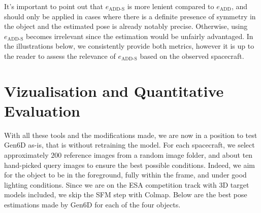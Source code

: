 It's important to point out that $e_{\mathrm{ADD}\text{-}\mathrm{S}}$ is more lenient compared to $e_\mathrm{ADD}$, and should only be applied in cases where there is a definite presence of symmetry in the object and the estimated pose is already notably precise. Otherwise, using $e_{\mathrm{ADD}\text{-}\mathrm{S}}$ becomes irrelevant since the estimation would be unfairly advantaged. In the illustrations below, we consistently provide both metrics, however it is up to the reader to assess the relevance of $e_{\mathrm{ADD}\text{-}\mathrm{S}}$ based on the observed spacecraft. 


\section{Vizualisation and Quantitative Evaluation}

With all these tools and the modifications made, we are now in a position to test Gen6D as-is, that is without retraining the model. For each spacecraft, we select approximately $200$ reference images from a random image folder, and about ten hand-picked query images to ensure the best possible conditions. Indeed, we aim for the object to be in the foreground, fully within the frame, and under good lighting conditions. Since we are on the \ac{ESA} competition track with 3D target models included, we skip the \ac{SFM} step with Colmap. Below are the best pose estimations made by Gen6D for each of the four objects.
 
\bigskip
 
